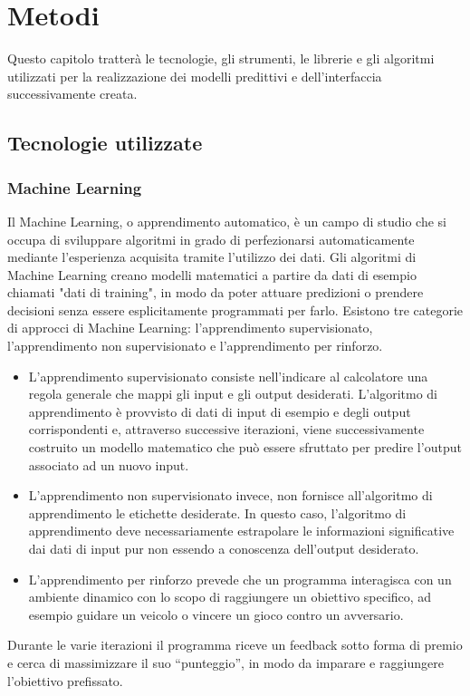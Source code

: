 \chapter{Metodi}
Questo capitolo tratterà le tecnologie, gli strumenti, le librerie e gli algoritmi utilizzati per la realizzazione dei modelli predittivi e dell’interfaccia successivamente creata. 
\section{Tecnologie utilizzate}
\subsection{Machine Learning}

Il Machine Learning, o apprendimento automatico, è un campo di studio che si occupa di sviluppare algoritmi in grado di perfezionarsi automaticamente mediante l'esperienza acquisita tramite l'utilizzo dei dati. 
Gli algoritmi di Machine Learning creano modelli matematici a partire da dati di esempio chiamati "dati di training", in modo da poter attuare predizioni o prendere decisioni senza essere esplicitamente programmati per farlo. 
Esistono tre categorie di approcci di Machine Learning: l'apprendimento supervisionato, l'apprendimento non supervisionato e l'apprendimento per rinforzo.
\begin{itemize}
    \item L'apprendimento supervisionato consiste nell’indicare al calcolatore una regola generale che mappi gli input e gli output desiderati. 
    L'algoritmo di apprendimento è provvisto di dati di input di esempio e degli output corrispondenti e, attraverso successive iterazioni, viene successivamente costruito un modello matematico che può essere sfruttato per predire l'output associato ad un nuovo input.
    \item L'apprendimento non supervisionato invece, non fornisce all'algoritmo di apprendimento le etichette desiderate. 
    In questo caso, l'algoritmo di apprendimento deve necessariamente estrapolare le informazioni significative dai dati di input pur non essendo a conoscenza dell'output desiderato.
    \item L'apprendimento per rinforzo prevede che un programma interagisca con un ambiente dinamico con lo scopo di raggiungere un obiettivo specifico, ad esempio guidare un veicolo o vincere un gioco contro un avversario. 
\end{itemize}
Durante le varie iterazioni il programma riceve un feedback sotto forma di premio e cerca di massimizzare il suo “punteggio”, in modo da imparare e raggiungere l'obiettivo prefissato.

